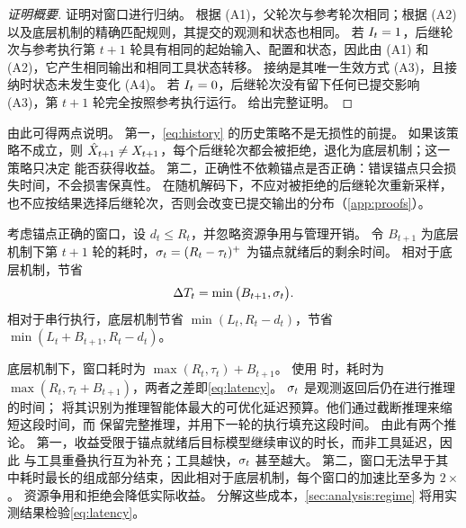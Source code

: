\begin{proof}[证明概要]
证明对窗口进行归纳。
根据 (A1)，父轮次与参考轮次相同；根据 (A2) 以及底层机制的精确匹配规则，其提交的观测和状态也相同。
若 $I_t=1$，后继轮次与参考执行第 $t{+}1$ 轮具有相同的起始输入、配置和状态，因此由 (A1) 和 (A2)，它产生相同输出和相同工具状态转移。
接纳是其唯一生效方式 (A3)，且接纳时状态未发生变化 (A4)。
若 $I_t=0$，后继轮次没有留下任何已提交影响 (A3)，第 $t{+}1$ 轮完全按照参考执行运行。
 给出完整证明。
\end{proof}

由此可得两点说明。
第一，\cref{eq:history} 的历史策略不是无损性的前提。
如果该策略不成立，则 $\hat X_{t+1}\neq X_{t+1}$，每个后继轮次都会被拒绝，\method 退化为底层机制；这一策略只决定 \method 能否获得收益。
第二，正确性不依赖锚点是否正确：错误锚点只会损失时间，不会损害保真性。
在随机解码下，不应对被拒绝的后继轮次重新采样，也不应按结果选择后继轮次，否则会改变已提交输出的分布（\cref{app:proofs}）。

\begin{proposition}[窗口延迟]
\label{prop:latency}
考虑锚点正确的窗口，设 $d_t\le R_t$，并忽略资源争用与管理开销。
令 $B_{t+1}$ 为底层机制下第 $t{+}1$ 轮的耗时，$\sigma_t=(R_t-\tau_t)^+$ 为锚点就绪后的剩余时间。
相对于底层机制，\method 节省
\begin{equation}
  \Delta T_t=\min\big(B_{t+1},\sigma_t\big).
  \label{eq:latency}
\end{equation}
相对于串行执行，底层机制节省 $\min(L_t,R_t-d_t)$，\method 节省 $\min(L_t+B_{t+1},R_t-d_t)$。
\end{proposition}

底层机制下，窗口耗时为 $\max(R_t,\tau_t)+B_{t+1}$。
使用 \method 时，耗时为 $\max(R_t,\tau_t+B_{t+1})$，两者之差即\cref{eq:latency}。
$\sigma_t$ 是观测返回后仍在进行推理的时间；\citet{anon2026eta} 将其识别为推理智能体最大的可优化延迟预算。他们通过截断推理来缩短这段时间，而 \method 保留完整推理，并用下一轮的执行填充这段时间。
由此有两个推论。
第一，收益受限于锚点就绪后目标模型继续审议的时长，而非工具延迟，因此 \method 与工具重叠执行互为补充；工具越快，$\sigma_t$ 甚至越大。
第二，窗口无法早于其中耗时最长的组成部分结束，因此相对于底层机制，每个窗口的加速比至多为 $2\times$。
资源争用和拒绝会降低实际收益。
 分解这些成本，\cref{sec:analysis:regime} 将用实测结果检验\cref{eq:latency}。

